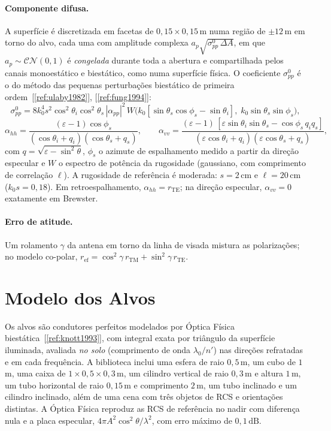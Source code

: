 \documentclass[12pt,a4paper,oneside]{book}
\theoremstyle{remark}
\newcommand{\dB}{\,\mathrm{dB}}
\newcommand{\citar}[1]{[\ref{ref:#1}]}
\theoremstyle{plain}
\theoremstyle{definition}
\begin{document}
\paragraph{Componente difusa.} A superfície é discretizada em facetas de
$0,15\times0,15\,$m numa região de $\pm12\,$m em torno do alvo, cada uma com
amplitude complexa $a_p\sqrt{\sigma^0_{pp}\,\Delta A}$, em que
$a_p\sim\mathcal{CN}(0,1)$ é \emph{congelada} durante toda a abertura e
compartilhada pelos canais monoestático e biestático, como numa superfície
física. O coeficiente $\sigma^0_{pp}$ é o do método das pequenas perturbações
biestático de primeira ordem~\citar{ulaby1982}, \citar{fung1994}:
\begin{equation}
  \sigma^0_{pp} = 8k_0^4s^2\cos^2\theta_i\cos^2\theta_s\,|\alpha_{pp}|^2\,
  W\!\big(k_0[\sin\theta_s\cos\phi_s-\sin\theta_i],\;k_0\sin\theta_s\sin\phi_s\big),
  \label{eq:spm}
\end{equation}
\begin{equation}
  \alpha_{hh}=\frac{(\varepsilon-1)\cos\phi_s}{(\cos\theta_i+q_i)(\cos\theta_s+q_s)},\qquad
  \alpha_{vv}=\frac{(\varepsilon-1)\,[\varepsilon\sin\theta_i\sin\theta_s-\cos\phi_s\,q_iq_s]}
                  {(\varepsilon\cos\theta_i+q_i)(\varepsilon\cos\theta_s+q_s)},
  \label{eq:alpha_pp}
\end{equation}
com $q=\sqrt{\varepsilon-\sin^2\theta}$, $\phi_s$ o azimute de espalhamento medido a
partir da direção especular e $W$ o espectro de potência da rugosidade
(gaussiano, com comprimento de correlação $\ell$). A rugosidade de referência é
moderada: $s=2\,$cm e $\ell=20\,$cm ($k_0s=0,18$). Em retroespalhamento,
$\alpha_{hh}=r_{\text{TE}}$; na direção especular, $\alpha_{vv}=0$ exatamente em
Brewster.

\paragraph{Erro de atitude.} Um rolamento $\gamma$ da antena em torno da linha
de visada mistura as polarizações; no modelo co-polar,
$r_{\text{ef}}=\cos^2\gamma\,r_{\text{TM}}+\sin^2\gamma\,r_{\text{TE}}$.

\section{Modelo dos Alvos}
\label{sec:mod_alvos}

Os alvos são condutores perfeitos modelados por Óptica Física
biestática~\citar{knott1993}, com integral exata por triângulo da superfície
iluminada, avaliada \emph{no solo} (comprimento de onda $\lambda_0/n'$) nas
direções refratadas e em cada frequência. A biblioteca inclui uma esfera de raio
$0,5\,$m, um cubo de $1\,$m, uma caixa de $1\times0,5\times0,3\,$m, um cilindro
vertical de raio $0,3\,$m e altura $1\,$m, um tubo horizontal de raio $0,15\,$m e
comprimento $2\,$m, um tubo inclinado e um cilindro inclinado, além de uma cena
com três objetos de RCS e orientações distintas. A Óptica Física reproduz as RCS
de referência no nadir com diferença nula e a placa especular,
$4\pi A^2\cos^2\theta/\lambda^2$, com erro máximo de $0,1\dB$.
\end{document}
